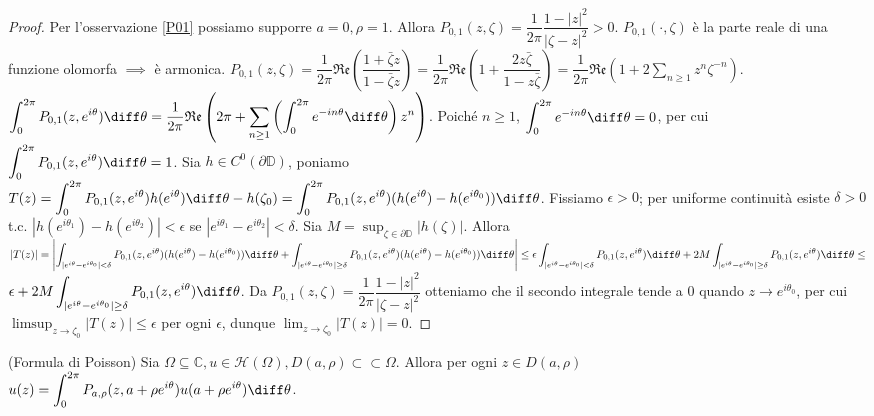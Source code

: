 \begin{proof}
  Per l'osservazione \ref{P01} possiamo supporre $a=0,\rho=1$. Allora $P_{0,1}(z,\zeta)=\dfrac{1}{2\pi}\dfrac{1-|z|^2}{|\zeta-z|^2}>0$. $P_{0,1}(\cdot,\zeta)$ è la parte reale di una funzione olomorfa $\implies$ è armonica.
  $\displaystyle P_{0,1}(z, \zeta)=\dfrac{1}{2\pi}\mathfrak{Re}\left(\dfrac{1+\bar{\zeta}z}{1-\bar{\zeta}z}\right)=\dfrac{1}{2\pi}\mathfrak{Re}\left(1+\dfrac{2z\bar{\zeta}}{1-z\bar{\zeta}}\right)=\dfrac{1}{2\pi}\mathfrak{Re}\left(1+2\sum_{n \ge 1} z^n\zeta^{-n}\right)$.
  $\displaystyle \int_0^{2\pi} P_{0,1}(z,e^{i\theta})\diff\theta=\dfrac{1}{2\pi}\mathfrak{Re}\left(2\pi+\sum_{n \ge 1} \left(\int_0^{2\pi} e^{-in\theta}\diff\theta \right)z^n\right)$.
  Poiché $n \ge 1$, $\displaystyle \int_0^{2\pi} e^{-in\theta}\diff\theta=0$, per cui $\displaystyle  \int_0^{2\pi} P_{0,1}(z,e^{i\theta})\diff\theta=1$.
  Sia $h \in C^0(\partial \mathbb{D})$, poniamo $\displaystyle T(z)=\int_0^{2\pi} P_{0,1}(z,e^{i\theta})h(e^{i\theta})\diff\theta-h(\zeta_0)=\int_0^{2\pi} P_{0,1}(z,e^{i\theta})(h(e^{i\theta})-h(e^{i\theta_0}))\diff\theta$.
  Fissiamo $\epsilon>0$; per uniforme continuità esiste $\delta>0$ t.c. $|h(e^{i\theta_1})-h(e^{i\theta_2})|<\epsilon$ se $|e^{i\theta_1}-e^{i\theta_2}|<\delta$. Sia $\displaystyle M=\sup_{\zeta \in \partial \mathbb{D}} |h(\zeta)|$.
  Allora $\displaystyle |T(z)|=\left|\int_{|e^{i\theta}-e^{i\theta_0}|<\delta} P_{0,1}(z,e^{i\theta})(h(e^{i\theta})-h(e^{i\theta_0}))\diff\theta+\int_{|e^{i\theta}-e^{i\theta_0}|\ge\delta} P_{0,1}(z,e^{i\theta})(h(e^{i\theta})-h(e^{i\theta_0}))\diff\theta\right| \le \epsilon\int_{|e^{i\theta}-e^{i\theta_0}|<\delta} P_{0,1}(z,e^{i\theta})\diff\theta+2M\int_{|e^{i\theta}-e^{i\theta_0}|\ge\delta} P_{0,1}(z,e^{i\theta})\diff\theta \le$ \\
  $\displaystyle \epsilon+2M\int_{|e^{i\theta}-e^{i\theta_0}|\ge\delta} P_{0,1}(z,e^{i\theta})\diff\theta$.
  Da $P_{0,1}(z,\zeta)=\dfrac{1}{2\pi}\dfrac{1-|z|^2}{|\zeta-z|^2}$ otteniamo che il secondo integrale tende a $0$ quando $z \longrightarrow e^{i\theta_0}$, per cui $\displaystyle \limsup_{z \longrightarrow \zeta_0} |T(z)| \le \epsilon$ per ogni $\epsilon$, dunque $\displaystyle \lim_{z \longrightarrow \zeta_0} |T(z)|=0$.
\end{proof}

\begin{cor}
  (Formula di Poisson) Sia $\Omega \subseteq \mathbb{C}, u \in \mathcal{H}(\Omega), D(a, \rho) \subset\subset \Omega$. Allora per ogni $z \in D(a,\rho)$ $\displaystyle u(z)=\int_0^{2\pi} P_{a,\rho}(z,a+\rho e^{i\theta})u(a+\rho e^{i\theta})\diff\theta$.
\end{cor}

